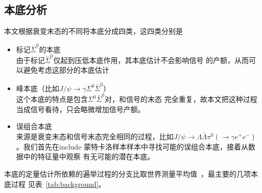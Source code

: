 \subsection{本底分析}%
\label{sec:bkg-ana-sigma0Decay}
本文根据衰变末态的不同将本底分成四类，这四类分别是
\begin{itemize}
        \item 标记$\bar{\Sigma}^{0}$的本底 \\
            由于标记$\bar{\Sigma}^{0}$仅起到压低本底作用，其本底估计不会影响信号
            的产额，从而可以避免考虑这部分的本底估计
        \item 峰本底（比如$J/\psi \to \gamma \Sigma^{0} \bar{\Sigma}^{0}$）\\
            这个本底的特点是包含$\Sigma^{0} \bar{\Sigma}^{0}$对，和信号的末态
            完全重复，故本文把这种过程当成信号看待，只会略微增加信号产额。
        \item 误组合本底 \\
            来源是衰变末态和信号末态完全相同的过程，比如$J/\psi \to \Lambda
            \bar{\Lambda} \pi^{0}(\to \gamma e^{+} e^{-})$。我们首先在include
            蒙特卡洛样本样本中寻找可能的误组合本底，接着从数据中的特征量中观察
            有无可能的潜在本底。
\end{itemize}
本底的定量估计所依赖的遍举过程的分支比取世界测量平均值~\cite{PDG}，最主要的几项本底过程
见表~\ref{tab:background}。
